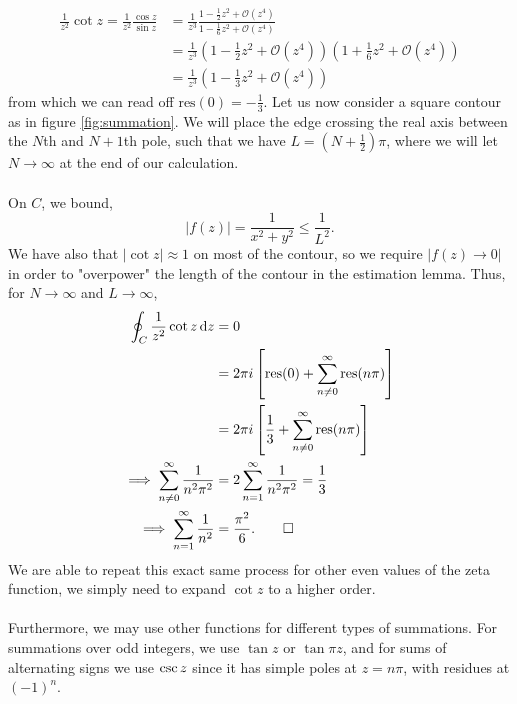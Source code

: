 \documentclass{book}
\begin{document}
\begin{equation}
	\begin{split}
		\frac{1}{z^2}\cot z = \frac{1}{z^2}\frac{\cos z}{\sin z} & = \frac{1}{z^{3}}\frac{1 - \frac{1}{2}z^2 + \mathcal{O}(z^4)}{1 - \frac{1}{6}z^2 + \mathcal{O}(z^4)} \\
		& = \frac{1}{z^{3}}\left(1 - \frac{1}{2}z^2 + \mathcal{O}(z^4)\right)\left(1 + \frac{1}{6}z^2 + \mathcal{O}(z^4)\right) \\
		& =\frac{1}{z^{3}}\left(1 - \frac{1}{3}z^2 + \mathcal{O}(z^4)\right)
	\end{split}
\end{equation}
from which we can read off $\text{res}(0) = -\frac{1}{3}$. Let us now consider a square contour as in figure \ref{fig:summation}. We will place the edge crossing the real axis between the $N$th and $N + 1$th pole, such that we have $L = \left(N + \frac{1}{2}\right)\pi$, where we will let $N \to \infty$ at the end of our calculation.
\\\\
On $C$, we bound,
\begin{equation}
	|f(z)| = \frac{1}{x^2 + y^2} \leq \frac{1}{L^2}.
\end{equation}
We have also that $|\cot z|\approx 1$ on most of the contour, so we require $|f(z) \to 0|$ in order to "overpower" the length of the contour in the estimation lemma. Thus, for $N \to \infty$ and $L \to \infty$,
\begin{equation}
	\begin{split}
		\oint_C \frac{1}{z^2}\cot z \dd{z} & = 0 \\
		& = 2\pi i\left[\text{res}(0) + \sum_{n \neq 0}^{\infty}\text{res}(n\pi)\right] \\
		& = 2\pi i \left[\frac{1}{3} + \sum_{n\neq 0}^{\infty} \text{res}(n\pi)\right] \\
		\implies \sum_{n\neq 0}^{\infty}\frac{1}{n^2\pi^2} & = 2\sum_{n=1}^{\infty}\frac{1}{n^2\pi^2}=\frac{1}{3} \\
		\implies \sum_{n=1}^{\infty}\frac{1}{n^2} &= \frac{\pi^2}{6}. \qed
	\end{split}
\end{equation}
We are able to repeat this exact same process for other even values of the zeta function, we simply need to expand $\cot z$ to a higher order.
\\\\
Furthermore, we may use other functions for different types of summations. For summations over odd integers, we use $\tan z$ or $\tan\pi z$, and for sums of alternating signs we use $\cosecant z$ since it has simple poles at $z = n\pi$, with residues at $(-1)^n$.
\end{document}

